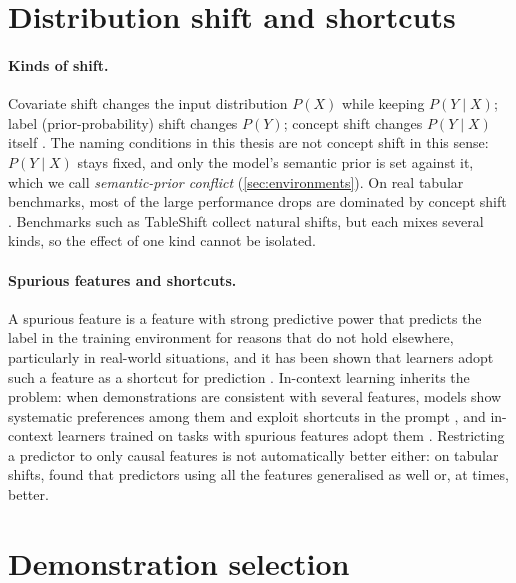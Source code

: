 \section{Distribution shift and shortcuts}
\label{sec:bg-shift}

\paragraph{Kinds of shift.}
Covariate shift changes the input distribution $P(X)$ while keeping $P(Y \mid X)$; label (prior-probability) shift changes $P(Y)$; concept shift changes $P(Y \mid X)$ itself \citep{shimodaira2000improving,quinonero2009dataset,morenotorres2012unifying}.
The naming conditions in this thesis are not concept shift in this sense: $P(Y \mid X)$ stays fixed, and only the model's semantic prior is set against it, which we call \emph{semantic-prior conflict} (\autoref{sec:environments}).
On real tabular benchmarks, most of the large performance drops are dominated by concept shift \citep{liu2023need}.
Benchmarks such as TableShift \citep{gardner2023tableshift} collect natural shifts, but each mixes several kinds, so the effect of one kind cannot be isolated.

\paragraph{Spurious features and shortcuts.}
A spurious feature is a feature with strong predictive power that predicts the label in the training environment for reasons that do not hold elsewhere, particularly in real-world situations, and it has been shown that learners adopt such a feature as a shortcut for prediction \citep{geirhos2020shortcut, nagarajan2021understanding}. In-context learning inherits the problem: when demonstrations are consistent with several features, models show systematic preferences among them \citep{si2023measuring} and exploit shortcuts in the prompt \citep{tang2023large}, and in-context learners trained on tasks with spurious features adopt them \citep{harutyunyan2026incontext,chen2026incontext}. Restricting a predictor to only causal features is not automatically better either: on tabular shifts, \citet{nastl2024causal} found that predictors using all the features generalised as well or, at times, better.

\section{Demonstration selection}
\label{sec:bg-selection}
